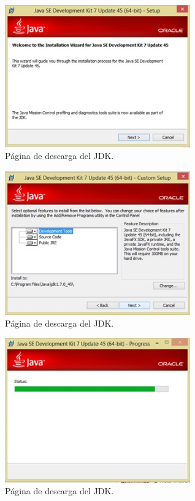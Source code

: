 \documentclass[12pt]{book} %
\begin{document}
\begin{enumerate}
	\begin{figure}[!hbp]
		\centering
			\includegraphics[width=8cm]{ins3.jpg}
			\caption{Página de descarga del JDK.}
		
	\end{figure}
	\begin{figure}[!hbp]
		\centering
			\includegraphics[width=8cm]{ins4.jpg}
			\caption{Página de descarga del JDK.}
		
	\end{figure}
	\begin{figure}[!hbp]
		\centering
			\includegraphics[width=8cm]{ins5.jpg}
			\caption{Página de descarga del JDK.}
		

\end{figure}
\end{enumerate}
\end{document}
